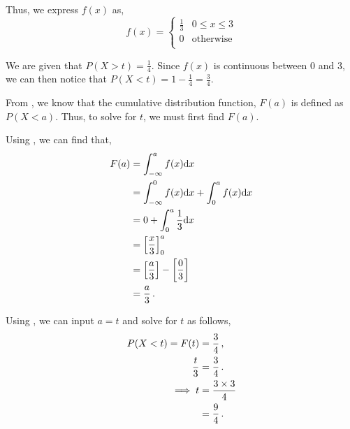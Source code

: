 \begin{subquestions}
\begin{subsubquestions}
Thus, we express $f(x)$ as,
\[
f(x) =
\begin{cases}
	\frac{1}{3} & \text{$0 \leq x \leq 3$} \\
	0    & \text{otherwise} \\
\end{cases}
\]

\subsubquestion

We are given that $P(X>t) = \frac{1}{4}$. Since $f(x)$ is continuous between 0 and 3, we can then notice that $P(X<t)=1-\frac{1}{4}=\frac{3}{4}$.

From , we know that the cumulative distribution function, $F(a)$ is defined as $P(X<a)$. Thus, to solve for $t$, we must first find $F(a)$.

Using , we can find that,
\begin{align}
	F(a) & = \int_{-\infty}^{a} f(x)\mathrm{d}x \nonumber \\
		 & = \int_{-\infty}^{0} f(x)\mathrm{d}x + \int_{0}^{a} f(x)\mathrm{d}x \nonumber \\
	     & = 0 + \int_{0}^{a} \frac{1}{3}\mathrm{d}x \nonumber \\
	     & = \left[\frac{x}{3} \right]_0^a \nonumber \\
	     & = \left[\frac{a}{3} \right] - \left[\frac{0}{3} \right] \nonumber \\
	     & = \frac{a}{3} \,. \label{2013:q4:CDF1}
\end{align}

Using , we can input $a=t$ and solve for $t$ as follows,
\begin{align}
	P(X<t)=  F(t) & =\frac{3}{4}\,, \nonumber \\
	        \frac{t}{3} & = \frac{3}{4} \,. \nonumber \\
	        \implies  t & = \frac{3 \times 3}{4} \nonumber \\
	                    & = \frac{9}{4} \,.
\end{align}

\end{subsubquestions}

\end{subquestions}

